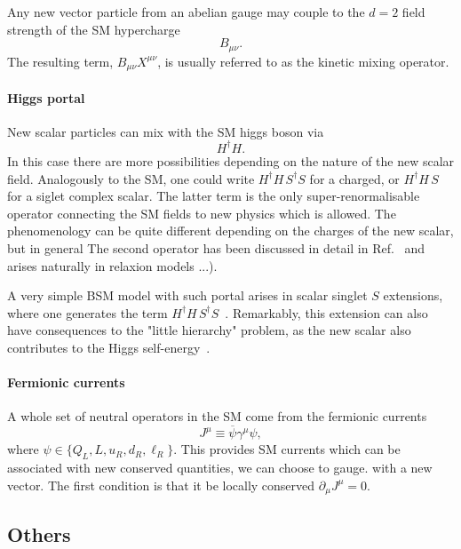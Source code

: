 Any new vector particle from an abelian gauge may couple to the $d=2$ field strength of the SM hypercharge
\begin{equation}
B_{\mu\nu}.
\end{equation}
The resulting term, $B_{\mu\nu} X^{\mu\nu}$, is usually referred to as the kinetic mixing operator.

\paragraph{Higgs portal}

New scalar particles can mix with the SM higgs boson via 
\begin{equation}
 H^\dagger H.
\end{equation}
In this case there are more possibilities depending on the nature of the new scalar field. Analogously to the SM, one could write  $H^\dagger H \, S^\dagger S$ for a charged, or $H^\dagger H\, S $ for a siglet complex scalar. The latter term is the only super-renormalisable operator connecting the SM fields to new physics which is allowed.  The phenomenology can be quite different depending on the charges of the new scalar, but in general The second operator has been discussed in detail in Ref.~\cite{Fradette:2018hhl} and arises naturally in relaxion models ...).

A very simple BSM model with such portal arises in scalar singlet $S$ extensions, where one generates the term $H^\dagger H \, S^\dagger S$~\cite{Silveira:1985rk}. Remarkably, this extension can also have consequences to the "little hierarchy" problem, as the new scalar also contributes to the Higgs self-energy~\cite{Craig:2013xia}.


\paragraph{Fermionic currents}

A whole set of neutral operators in the SM come from the fermionic currents
\begin{equation}
 J^\mu \equiv \overline{\psi} \gamma^\mu \psi,
\end{equation}
where $\psi \in \{Q_L, L, u_R, d_R, \ell_R\}$. This provides SM currents which can be associated with new conserved quantities, \eg we can choose to gauge. with a new vector. The first condition is that it be locally conserved $\partial_\mu J^\mu = 0$. 


\subsection{Others}

